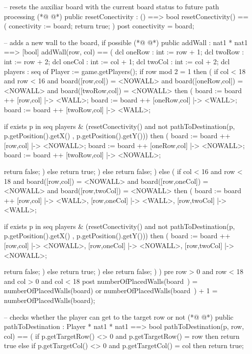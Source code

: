 \begin{vdmpp}[breaklines=true]
  -- resets the auxiliar board with the current board status to future path processing
(*@
\label{resetConectivity:132}
@*)
  public resetConectivity : () ==> bool
  resetConectivity() == 
  (
   conectivity := board;
   return true;
  )
  post conectivity = board;
  
  -- adds a new wall to the board, if possible
(*@
\label{addWall:141}
@*)
  public addWall : nat1 * nat1 ==> [bool]
  addWall(row, col) == 
  (
   dcl oneRow : int := row + 1;
   dcl twoRow : int := row + 2;
   dcl oneCol : int := col + 1;
   dcl twoCol : int := col + 2;
   dcl players : seq of Player := game.getPlayers();
   if row mod 2 = 1
   then 
   (
    if col < 18 and row < 16 and board([row,col]) = <NOWALL> and board([oneRow,col]) = <NOWALL> and board([twoRow,col]) = <NOWALL>
    then
    (
     board := board ++ {[row,col] |-> <WALL>};
     board := board ++ {[oneRow,col] |-> <WALL>};
     board := board ++ {[twoRow,col] |-> <WALL>};
     
     if exists p in seq players & (resetConectivity() and not pathToDestination(p, p.getPosition().getX() , p.getPosition().getY()))
     then
     (
      board := board ++ {[row,col] |-> <NOWALL>};
      board := board ++ {[oneRow,col] |-> <NOWALL>};
      board := board ++ {[twoRow,col] |-> <NOWALL>};
      
      return false;
     )
     else return true;
    )
    else return false;
   )
   else
   (
    if col < 16 and row < 18 and board([row,col]) = <NOWALL> and board([row,oneCol]) = <NOWALL> and board([row,twoCol]) = <NOWALL>
    then
    (
     board := board ++ {[row,col] |-> <WALL>, [row,oneCol] |-> <WALL>, [row,twoCol] |-> <WALL>};
     
     if exists p in seq players & (resetConectivity() and not pathToDestination(p, p.getPosition().getX() , p.getPosition().getY()))
     then
     (
      board := board ++ {[row,col] |-> <NOWALL>, [row,oneCol] |-> <NOWALL>, [row,twoCol] |-> <NOWALL>};
     
      return false;
     )
     else return true;
    )
    else return false;
   )
  )
  pre row > 0 and row < 18 and col > 0 and col < 18
  post numberOfPlacedWalls(board~) = numberOfPlacedWalls(board) or numberOfPlacedWalls(board~) + 1 = numberOfPlacedWalls(board);
  
  
  -- checks whether the player can get to the target row or not
(*@
\label{pathToDestination:196}
@*)
  public pathToDestination : Player * nat1 * nat1 ==> bool
  pathToDestination(p, row, col) ==
  (
   if p.getTargetRow() <> 0 and p.getTargetRow() = row
    then return true
   else if p.getTargetCol() <> 0 and p.getTargetCol() = col
    then return true;
    

\end{vdmpp}
